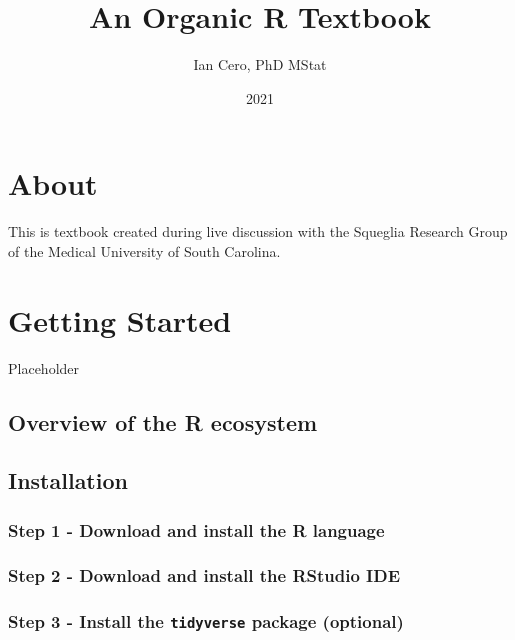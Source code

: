 \documentclass[
]{book}
\title{An Organic R Textbook}
\author{Ian Cero, PhD MStat}
\date{2021}
\begin{document}
\maketitle

{
\setcounter{tocdepth}{1}
\tableofcontents
}
\hypertarget{about}{%
\chapter{About}\label{about}}

This is textbook created during live discussion with the Squeglia Research Group of the Medical University of South Carolina.

\hypertarget{getting-started}{%
\chapter{Getting Started}\label{getting-started}}

Placeholder

\hypertarget{overview-of-the-r-ecosystem}{%
\section{Overview of the R ecosystem}\label{overview-of-the-r-ecosystem}}

\hypertarget{installation}{%
\section{Installation}\label{installation}}

\hypertarget{step-1---download-and-install-the-r-language}{%
\subsection{Step 1 - Download and install the R language}\label{step-1---download-and-install-the-r-language}}

\hypertarget{step-2---download-and-install-the-rstudio-ide}{%
\subsection{Step 2 - Download and install the RStudio IDE}\label{step-2---download-and-install-the-rstudio-ide}}

\hypertarget{step-3---install-the-tidyverse-package-optional}{%
\subsection{\texorpdfstring{Step 3 - Install the \texttt{tidyverse} package (optional)}{Step 3 - Install the tidyverse package (optional)}}\label{step-3---install-the-tidyverse-package-optional}}
\end{document}
